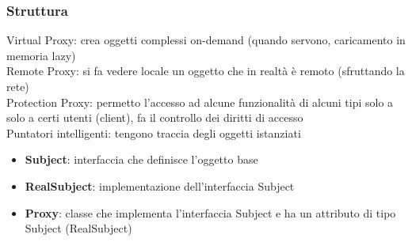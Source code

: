 \subsubsection{Struttura}
Virtual Proxy: crea oggetti complessi on-demand (quando servono, caricamento in memoria lazy) \\
Remote Proxy: si fa vedere locale un oggetto che in realtà è remoto (sfruttando la rete)\\
Protection Proxy: permetto l'accesso ad alcune funzionalità di alcuni tipi solo a solo a certi utenti (client), fa il controllo dei diritti di accesso\\
Puntatori intelligenti: tengono traccia degli oggetti istanziati\\
\begin{itemize}
    \item \textbf{Subject}: interfaccia che definisce l'oggetto base 
    \item \textbf{RealSubject}: implementazione dell'interfaccia Subject
    \item \textbf{Proxy}: classe che implementa l'interfaccia Subject e ha un attributo di tipo Subject (RealSubject)
\end{itemize}